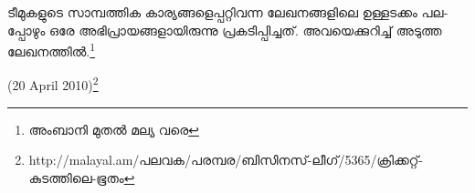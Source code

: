 ­ടീ­മു­ക­ളു­ടെ സാ­മ്പ­ത്തിക കാ­ര്യ­ങ്ങ­ളെ­പ്പ­റ്റി­വ­ന്ന ലേ­ഖ­ന­ങ്ങ­ളി­ലെ ഉള്ള­ട­ക്കം പല­പ്പോ­ഴും ഒരേ അഭി­പ്രാ­യ­ങ്ങ­ളാ­യി­രു­ന്നു പ്ര­ക­ടി­പ്പി­ച്ച­ത്. 
അവ­യെ­ക്കു­റി­ച്ച് അടുത്ത ലേ­ഖ­ന­ത്തില്‍.\footnote{അംബാനി മുതല്‍ മല്യ വരെ}

(20 April 2010)\footnote{http://malayal.am/പലവക/പരമ്പര/ബിസിനസ്-ലീഗ്/5365/ക്രിക്കറ്റ്-കുടത്തിലെ-ഭൂതം}

\newpage
